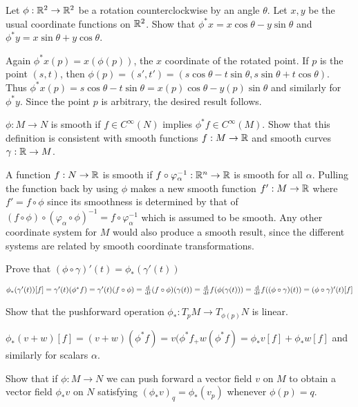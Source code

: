 {\begin{p}
{Let $\phi:\mathbb{R}^2\rightarrow \mathbb{R}^2$ be a rotation counterclockwise
by an angle $\theta$. Let $x,y$ be the usual coordinate functions on $\mathbb{R}^2$. Show that
$\phi^*x=x\cos \theta-y\sin\theta$ and $\phi^*y=x\sin\theta+y\cos\theta$.}
\end{p}

Again $\phi^*x(p)=x(\phi(p))$, the $x$ coordinate of the rotated point. 
If $p$ is the point $(s,t)$, then 
$\phi(p)=(s',t')=(s\cos\theta-t\sin\theta,s\sin\theta+t\cos\theta)$. 
Thus $\phi^*x(p)=s\cos\theta-t\sin\theta=x(p)\cos\theta-y(p)\sin\theta$ and similarly for $\phi^*y$. 
Since the point $p$ is arbitrary, the desired result follows.

\begin{p}{$\phi:M\rightarrow N$ is smooth if $f\in C^\infty(N)$ implies $\phi^*f\in C^\infty(M)$. Show
that this definition is consistent with smooth functions $f:M\rightarrow\mathbb{R}$ and smooth
curves $\gamma:\mathbb{R}\rightarrow M$.}
\end{p}

A function $f:N\rightarrow\mathbb{R}$ is smooth if 
$f\circ\varphi^{-1}_\alpha:\mathbb{R}^n\rightarrow \mathbb{R}$ is smooth
for all $\alpha$. Pulling the function back by using $\phi$ makes a new smooth function $f':M\rightarrow 
\mathbb{R}$ where $f'=f\circ\phi$ since its smoothness is determined by
that of $(f\circ\phi)\circ(\varphi_\alpha\circ\phi)^{-1}=f\circ\varphi^{-1}_\alpha$ which is assumed to
be smooth. Any other coordinate system for $M$ would also produce a smooth result, since the 
different systems are related by smooth coordinate transformations.

\begin{p}{Prove that $(\phi\circ\gamma)'(t)=\phi_*(\gamma'(t))$}
\end{p}

$\phi_*(\gamma'(t))[f]=\gamma'(t)(\phi^*f)=\gamma'(t)(f\circ\phi)=\frac{\rm d}{{\rm d}t}(f\circ\phi)(\gamma(t))=\frac{\rm d}{{\rm d}t}f(\phi(\gamma(t)))=\frac{\rm d}{{\rm d}t}f((\phi\circ\gamma)(t))=(\phi\circ\gamma)'(t)[f]$

\begin{p}
 Show that the pushforward operation $\phi_*:T_pM\rightarrow T_{\phi(p)}N$ is linear.
 \end{p}

$\phi_*(v+w)[f]=(v+w)(\phi^*f)=v(\phi^*f_+w(\phi^*f)=\phi_*v[f]+\phi_*w[f]$ and similarly for scalars $\alpha$.

\begin{p}{Show that if $\phi:M\rightarrow N$
we can push forward a vector field $v$ on $M$ to obtain a vector field 
$\phi_*v$ on $N$ satisfying $(\phi_*v)_q=\phi_*(v_p)$ whenever $\phi(p)=q$.}
\end{p}

}
